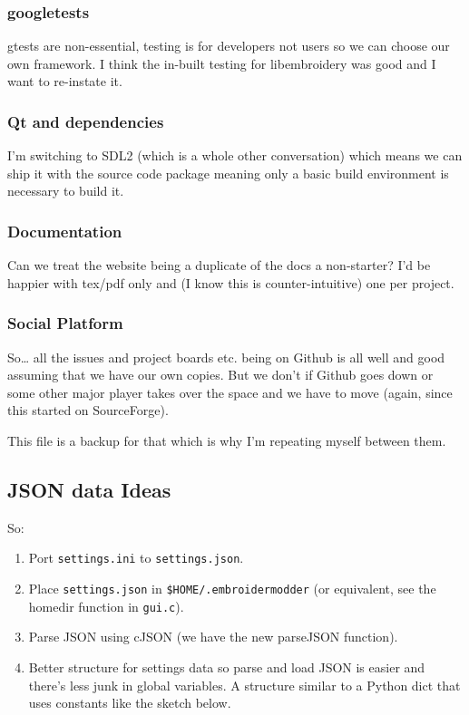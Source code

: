 \documentclass[a4paper, 11pt]{report}
\begin{document}
\hypertarget{googletests}{%
\subsubsection{googletests}\label{googletests}}

gtests are non-essential, testing is for developers not users so we can
choose our own framework. I think the in-built testing for libembroidery
was good and I want to re-instate it.

\hypertarget{qt-and-dependencies}{%
\subsubsection{Qt and dependencies}\label{qt-and-dependencies}}

I'm switching to SDL2 (which is a whole other conversation) which means
we can ship it with the source code package meaning only a basic build
environment is necessary to build it.

\hypertarget{documentation}{%
\subsubsection{Documentation}\label{documentation}}

Can we treat the website being a duplicate of the docs a non-starter?
I'd be happier with tex/pdf only and (I know this is counter-intuitive)
one per project.

\hypertarget{social-platform}{%
\subsubsection{Social Platform}\label{social-platform}}

So\ldots{} all the issues and project boards etc. being on Github is all
well and good assuming that we have our own copies. But we don't if
Github goes down or some other major player takes over the space and we
have to move (again, since this started on SourceForge).

This file is a backup for that which is why I'm repeating myself between
them.

\hypertarget{json-data-ideas}{%
\subsection{JSON data Ideas}\label{json-data-ideas}}

So:

\begin{enumerate}
\def\labelenumi{\arabic{enumi}.}
\item
  Port \texttt{settings.ini} to \texttt{settings.json}.
\item
  Place \texttt{settings.json} in \texttt{\$HOME/.embroidermodder} (or
  equivalent, see the homedir function in \texttt{gui.c}).
\item
  Parse JSON using cJSON (we have the new parseJSON function).
\item
  Better structure for settings data so parse and load JSON is easier
  and there's less junk in global variables. A structure similar to a
  Python dict that uses constants like the sketch below.
\end{enumerate}
\end{document}
